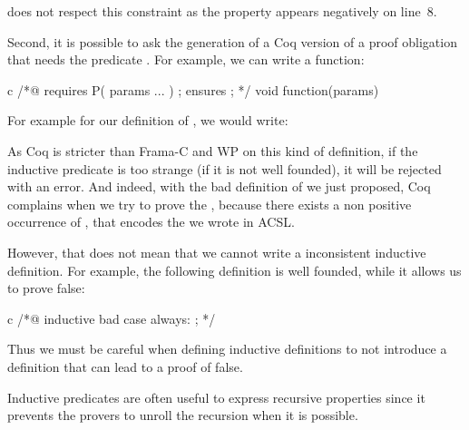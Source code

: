 
does not respect this constraint as the property 
appears negatively on line~8.

Second, it is possible to ask the generation of a Coq version of a proof
obligation that needs the predicate . For example, we can
write a function:



\begin{CodeBlock}{c}
/*@
  requires P( params ... ) ;
  ensures  \false ;
*/ void function(params){

}
\end{CodeBlock}



For example for our definition of , we would write:






As Coq is stricter than Frama-C and WP on this kind of definition, if the
inductive predicate is too strange (if it is not well founded), it will be
rejected with an error. And indeed, with the bad definition of
 we just proposed, Coq complains when we try to prove
the , because there exists a non
positive occurrence of , that encodes the
 we wrote in ACSL.






However, that does not mean that we cannot write a inconsistent inductive
definition. For example, the following definition is well founded, while it
allows us to prove false:


\begin{CodeBlock}{c}
/*@
  inductive bad {
    case always: \false ;
  }
*/
\end{CodeBlock}


Thus we must be careful when defining inductive definitions to not introduce a
definition that can lead to a proof of false.



Inductive predicates are often useful to express recursive properties since it
prevents the provers to unroll the recursion when it is possible.

